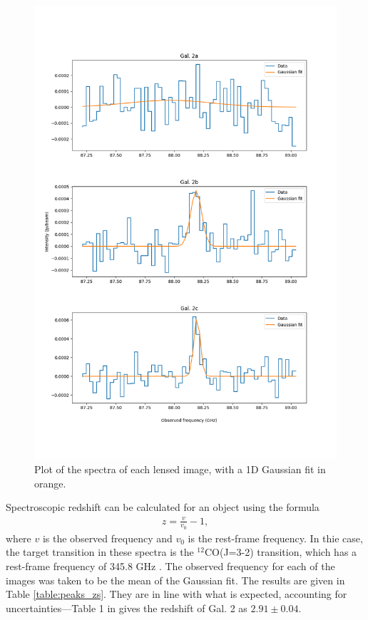 \documentclass[11pt]{article}
\begin{document}
\begin{figure}[!htbp]
    \centering
    \includegraphics[width=0.8\linewidth]{../figs/gaussian_fit.png}
	\caption{Plot of the spectra of each lensed image, with a 1D Gaussian fit in orange.} 
    \label{fig:gaussian_fit}
\end{figure}

Spectroscopic redshift can be calculated for an object using the formula 
\begin{align}\label{eqn:redshift}
	z = \frac{v}{v_0} - 1,
\end{align}
where $v$ is the observed frequency and $v_0$ is the rest-frame frequency. In thie case, the target transition in these spectra is the $^{12}$CO(J=3-2) transition, which has a rest-frame frequency of 345.8 GHz \citep{Carilli2013}. The observed frequency for each of the images was taken to be the mean of the Gaussian fit. The results are given in Table \ref{table:peaks_zs}. They are in line with what is expected, accounting for uncertainties---Table 1 in \cite{MacKenzie2014} gives the redshift of Gal. 2 as $2.91\pm0.04$. 
\end{document}
